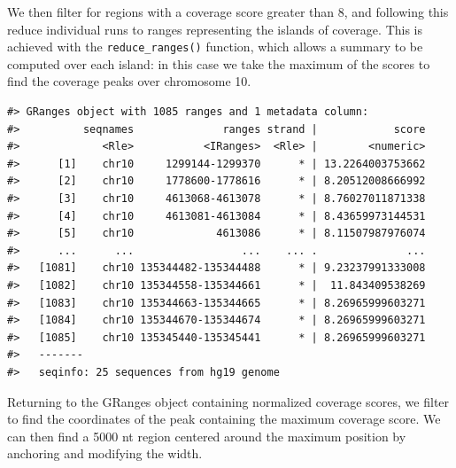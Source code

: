 \documentclass[]{article}
\newenvironment{Shaded}{\begin{snugshade}}{\end{snugshade}}
\newcommand{\DataTypeTok}[1]{\textcolor[rgb]{0.13,0.29,0.53}{#1}}
\newcommand{\DecValTok}[1]{\textcolor[rgb]{0.00,0.00,0.81}{#1}}
\newcommand{\KeywordTok}[1]{\textcolor[rgb]{0.13,0.29,0.53}{\textbf{#1}}}
\newcommand{\NormalTok}[1]{#1}
\newcommand{\OperatorTok}[1]{\textcolor[rgb]{0.81,0.36,0.00}{\textbf{#1}}}
\newcommand{\StringTok}[1]{\textcolor[rgb]{0.31,0.60,0.02}{#1}}
\begin{document}
We then filter for regions with a coverage score greater than 8, and
following this reduce individual runs to ranges representing the islands
of coverage. This is achieved with the \texttt{reduce\_ranges()}
function, which allows a summary to be computed over each island: in
this case we take the maximum of the scores to find the coverage peaks
over chromosome 10.

\begin{Shaded}
\end{Shaded}

\begin{verbatim}
#> GRanges object with 1085 ranges and 1 metadata column:
#>          seqnames              ranges strand |            score
#>             <Rle>           <IRanges>  <Rle> |        <numeric>
#>      [1]    chr10     1299144-1299370      * | 13.2264003753662
#>      [2]    chr10     1778600-1778616      * | 8.20512008666992
#>      [3]    chr10     4613068-4613078      * | 8.76027011871338
#>      [4]    chr10     4613081-4613084      * | 8.43659973144531
#>      [5]    chr10             4613086      * | 8.11507987976074
#>      ...      ...                 ...    ... .              ...
#>   [1081]    chr10 135344482-135344488      * | 9.23237991333008
#>   [1082]    chr10 135344558-135344661      * |  11.843409538269
#>   [1083]    chr10 135344663-135344665      * | 8.26965999603271
#>   [1084]    chr10 135344670-135344674      * | 8.26965999603271
#>   [1085]    chr10 135345440-135345441      * | 8.26965999603271
#>   -------
#>   seqinfo: 25 sequences from hg19 genome
\end{verbatim}

Returning to the GRanges object containing normalized coverage scores,
we filter to find the coordinates of the peak containing the maximum
coverage score. We can then find a 5000 nt region centered around the
maximum position by anchoring and modifying the width.

\begin{Shaded}
\end{Shaded}
\end{document}
